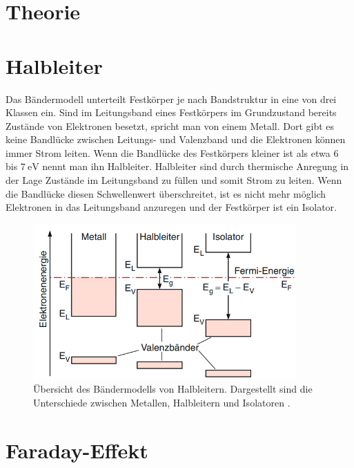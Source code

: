 \section{Theorie}
\label{sec:Theorie}

\section{Halbleiter}
\label{sec:halbleiter}

Das Bändermodell unterteilt Festkörper je nach Bandstruktur in eine von drei Klassen ein.
Sind im Leitungsband eines Festkörpers im Grundzustand bereits Zustände von Elektronen besetzt, spricht man von einem Metall.
Dort gibt es keine Bandlücke zwischen Leitungs- und Valenzband und die Elektronen können immer Strom leiten.
Wenn die Bandlücke des Festkörpers kleiner ist als etwa $\qty{6}$ bis $\qty{7}{\eV}$ nennt man ihn Halbleiter.
Halbleiter sind durch thermische Anregung in der Lage Zustände im Leitungsband zu füllen und somit Strom zu leiten.
Wenn die Bandlücke diesen Schwellenwert überschreitet, ist es nicht mehr möglich Elektronen in das Leitungsband anzuregen und der Festkörper ist ein Isolator.

\begin{figure}
    \centering
    \includegraphics[width=0.9\textwidth]{figure/halbleiter.png}
    \caption{Übersicht des Bändermodells von Halbleitern. Dargestellt sind die Unterschiede zwischen Metallen, Halbleitern und Isolatoren \cite{demtroder}.}
    \label{fig:halbleiter}
\end{figure}

\section{Faraday-Effekt}
\label{sec:faraday}